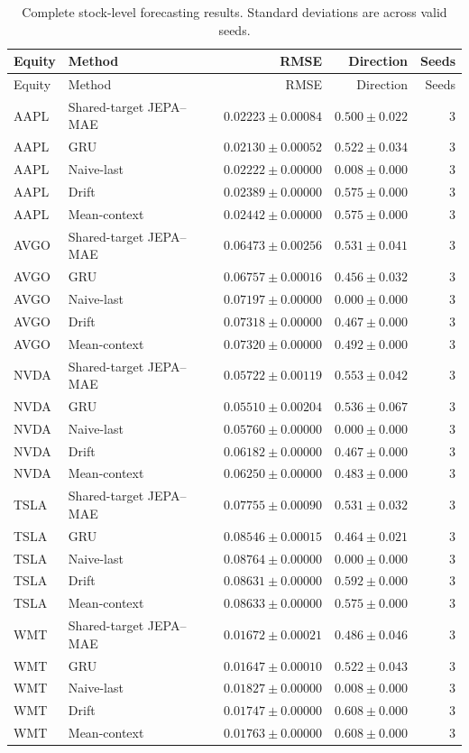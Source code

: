 \begin{longtable}{llrrr}
\caption{Complete stock-level forecasting results. Standard deviations are across valid seeds.}\label{tab:appendix_stock_metrics}\\
\toprule
Equity & Method & RMSE & Direction & Seeds \\
\midrule
\endfirsthead
\toprule
Equity & Method & RMSE & Direction & Seeds \\
\midrule
\endhead
AAPL & Shared-target JEPA--MAE & $0.02223 \pm 0.00084$ & $0.500 \pm 0.022$ & 3 \\
AAPL & GRU & $0.02130 \pm 0.00052$ & $0.522 \pm 0.034$ & 3 \\
AAPL & Naive-last & $0.02222 \pm 0.00000$ & $0.008 \pm 0.000$ & 3 \\
AAPL & Drift & $0.02389 \pm 0.00000$ & $0.575 \pm 0.000$ & 3 \\
AAPL & Mean-context & $0.02442 \pm 0.00000$ & $0.575 \pm 0.000$ & 3 \\
AVGO & Shared-target JEPA--MAE & $0.06473 \pm 0.00256$ & $0.531 \pm 0.041$ & 3 \\
AVGO & GRU & $0.06757 \pm 0.00016$ & $0.456 \pm 0.032$ & 3 \\
AVGO & Naive-last & $0.07197 \pm 0.00000$ & $0.000 \pm 0.000$ & 3 \\
AVGO & Drift & $0.07318 \pm 0.00000$ & $0.467 \pm 0.000$ & 3 \\
AVGO & Mean-context & $0.07320 \pm 0.00000$ & $0.492 \pm 0.000$ & 3 \\
NVDA & Shared-target JEPA--MAE & $0.05722 \pm 0.00119$ & $0.553 \pm 0.042$ & 3 \\
NVDA & GRU & $0.05510 \pm 0.00204$ & $0.536 \pm 0.067$ & 3 \\
NVDA & Naive-last & $0.05760 \pm 0.00000$ & $0.000 \pm 0.000$ & 3 \\
NVDA & Drift & $0.06182 \pm 0.00000$ & $0.467 \pm 0.000$ & 3 \\
NVDA & Mean-context & $0.06250 \pm 0.00000$ & $0.483 \pm 0.000$ & 3 \\
TSLA & Shared-target JEPA--MAE & $0.07755 \pm 0.00090$ & $0.531 \pm 0.032$ & 3 \\
TSLA & GRU & $0.08546 \pm 0.00015$ & $0.464 \pm 0.021$ & 3 \\
TSLA & Naive-last & $0.08764 \pm 0.00000$ & $0.000 \pm 0.000$ & 3 \\
TSLA & Drift & $0.08631 \pm 0.00000$ & $0.592 \pm 0.000$ & 3 \\
TSLA & Mean-context & $0.08633 \pm 0.00000$ & $0.575 \pm 0.000$ & 3 \\
WMT & Shared-target JEPA--MAE & $0.01672 \pm 0.00021$ & $0.486 \pm 0.046$ & 3 \\
WMT & GRU & $0.01647 \pm 0.00010$ & $0.522 \pm 0.043$ & 3 \\
WMT & Naive-last & $0.01827 \pm 0.00000$ & $0.008 \pm 0.000$ & 3 \\
WMT & Drift & $0.01747 \pm 0.00000$ & $0.608 \pm 0.000$ & 3 \\
WMT & Mean-context & $0.01763 \pm 0.00000$ & $0.608 \pm 0.000$ & 3 \\
\bottomrule
\end{longtable}
